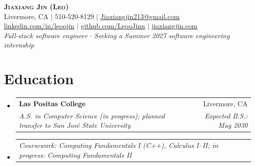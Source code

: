 \documentclass[letterpaper,11pt]{article}
\makeatletter
\newcommand{\resumeSubheading}[4]{
  \vspace{-2pt}\item
    \begin{tabular*}{0.97\textwidth}[t]{l@{\extracolsep{\fill}}r}
      \textbf{#1} & #2 \\
      \textit{\small#3} & \textit{\small #4} \\
    \end{tabular*}\vspace{-7pt}
}
\newcommand{\resumeSubSubheading}[2]{
    \item
    \begin{tabular*}{0.97\textwidth}{l@{\extracolsep{\fill}}r}
      \textit{\small#1} & \textit{\small #2} \\
    \end{tabular*}\vspace{-7pt}
}
\newcommand{\resumeSubHeadingListStart}{\begin{itemize}[leftmargin=0.15in, label={}]}
\newcommand{\resumeSubHeadingListEnd}{\end{itemize}}
\makeatother
\begin{document}
\begin{center}
    \textbf{\Huge \scshape Jiaxiang Jin (Leo)} \\ \vspace{1pt}
    \small Livermore, CA $|$ 510-520-8129 $|$
    \href{mailto:Jiaxiangjin213@gmail.com}{\underline{Jiaxiangjin213@gmail.com}} \\ \vspace{1pt}
    \small \href{https://www.linkedin.com/in/leoojin/}{\underline{linkedin.com/in/leoojin}} $|$
    \href{https://github.com/LeooJinn}{\underline{github.com/LeooJinn}} $|$
    \href{https://jiaxiangjin.com}{\underline{jiaxiangjin.com}} \\ \vspace{2pt}
    \small \textit{Full-stack software engineer $\cdot$ Seeking a Summer 2027 software engineering internship}
\end{center}

\section{Education}
  \resumeSubHeadingListStart
    \resumeSubheading
      {Las Positas College}{Livermore, CA}
      {A.S. in Computer Science (in progress); planned transfer to San Jos\'e State University}{Expected B.S.: May 2030}
      \resumeSubSubheading
        {Coursework: Computing Fundamentals I (C++), Calculus I--II; in progress: Computing Fundamentals II}{}
  \resumeSubHeadingListEnd

\end{document}
